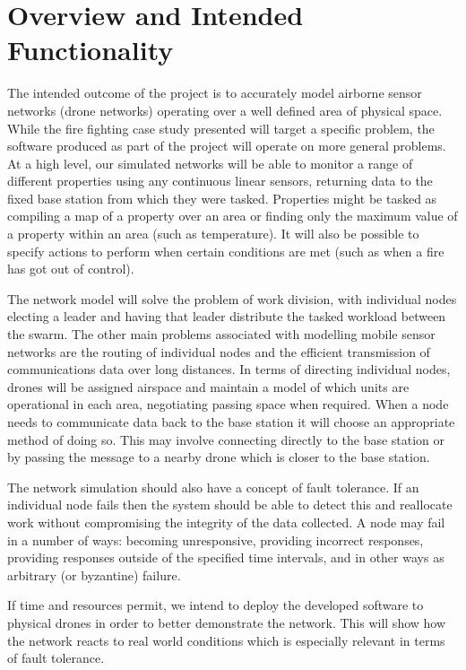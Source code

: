 \documentclass[10pt,a4paper]{article}
\begin{document}
	\section{Overview and Intended Functionality}
	The intended outcome of the project is to accurately model airborne sensor networks (drone networks) operating over a well defined area of physical space. While the fire fighting case study presented will target a specific problem, the software produced as part of the project will operate on more general problems. At a high level, our simulated networks will be able to monitor a range of different properties using any continuous linear sensors, returning data to the fixed base station from which they were tasked. Properties might be tasked as compiling a map of a property over an area or finding only the maximum value of a property within an area (such as temperature). It will also be possible to specify actions to perform when certain conditions are met (such as when a fire has got out of control).
	
	The network model will solve the problem of work division, with individual nodes electing a leader and having that leader distribute the tasked workload between the swarm. The other main problems associated with modelling mobile sensor networks are the routing of individual nodes and the efficient transmission of communications data over long distances. In terms of directing individual nodes, drones will be assigned airspace and maintain a model of which units are operational in each area, negotiating passing space when required. When a node needs to communicate data back to the base station it will choose an appropriate method of doing so. This may involve connecting directly to the base station or by passing the message to a nearby drone which is closer to the base station.

    The network simulation should also have a concept of fault tolerance. If an individual node fails then the system should be able to detect this and reallocate work without compromising the integrity of the data collected. A node may fail in a number of ways: becoming unresponsive, providing incorrect responses, providing responses outside of the specified time intervals, and in other ways as arbitrary (or byzantine) failure.
    
    If time and resources permit, we intend to deploy the developed software to physical drones in order to better demonstrate the network. This will show how the network reacts to real world conditions which is especially relevant in terms of fault tolerance.
\end{document}
